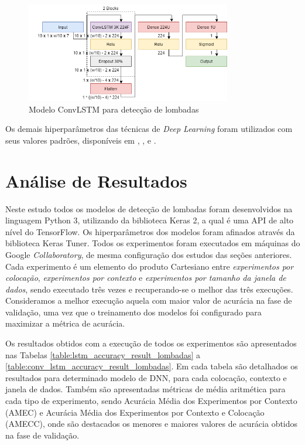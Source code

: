 \begin{figure}[h!]
  \centering
  \caption{Modelo ConvLSTM para detecção de lombadas}
  \label{fig:best_conv_lstm_tipo_lombadas}
  \includegraphics[width=0.8\textwidth]{figuras/fig_44.png}
\end{figure}

Os demais hiperparâmetros das técnicas de \textit{Deep Learning} foram utilizados com seus valores padrões, disponíveis em , ,  e .

\section{Análise de Resultados}

Neste estudo todos os modelos de detecção de lombadas foram desenvolvidos na linguagem Python 3, utilizando da biblioteca Keras 2, a qual é uma API de alto nível do TensorFlow. Os hiperparâmetros dos modelos foram afinados através da biblioteca Keras Tuner. Todos os experimentos foram executados em máquinas do Google \textit{Collaboratory}, de mesma configuração dos estudos das seções anteriores. Cada experimento é um elemento do produto Cartesiano entre \emph{experimentos por colocação}, \emph{experimentos por contexto} e \emph{experimentos por tamanho da janela de dados}, sendo executado três vezes e recuperando-se o melhor das três execuções. Consideramos a melhor execução aquela com maior valor de acurácia na fase de validação, uma vez que o treinamento dos modelos foi configurado para maximizar a métrica de acurácia.

Os resultados obtidos com a execução de todos os experimentos são apresentados nas Tabelas \ref{table:lstm_accuracy_result_lombadas} a \ref{table:conv_lstm_accuracy_result_lombadas}. Em cada tabela são detalhados os resultados para determinado modelo de DNN, para cada colocação, contexto e janela de dados. Também são apresentadas métricas de média aritmética para cada tipo de experimento, sendo Acurácia Média dos Experimentos por Contexto (AMEC) e Acurácia Média dos Experimentos por Contexto e Colocação (AMECC), onde são destacados os menores e maiores valores de acurácia obtidos na fase de validação.

